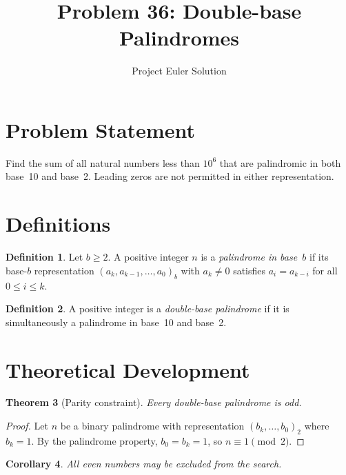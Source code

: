 \documentclass[12pt]{article}
\title{Problem 36: Double-base Palindromes}
\author{Project Euler Solution}
\date{}
\newtheorem{theorem}{Theorem}
\newtheorem{corollary}[theorem]{Corollary}
\theoremstyle{definition}
\newtheorem{definition}[theorem]{Definition}
\begin{document}
\maketitle

\section{Problem Statement}
Find the sum of all natural numbers less than $10^6$ that are palindromic in both base~10 and base~2. Leading zeros are not permitted in either representation.

\section{Definitions}

\begin{definition}
Let $b \ge 2$. A positive integer $n$ is a \emph{palindrome in base~$b$} if its base-$b$ representation $(a_k, a_{k-1}, \ldots, a_0)_b$ with $a_k \ne 0$ satisfies $a_i = a_{k-i}$ for all $0 \le i \le k$.
\end{definition}

\begin{definition}
A positive integer is a \emph{double-base palindrome} if it is simultaneously a palindrome in base~10 and base~2.
\end{definition}

\section{Theoretical Development}

\begin{theorem}[Parity constraint]
Every double-base palindrome is odd.
\end{theorem}
\begin{proof}
Let $n$ be a binary palindrome with representation $(b_k, \ldots, b_0)_2$ where $b_k = 1$. By the palindrome property, $b_0 = b_k = 1$, so $n \equiv 1 \pmod{2}$.
\end{proof}

\begin{corollary}
All even numbers may be excluded from the search.
\end{corollary}
\end{document}
